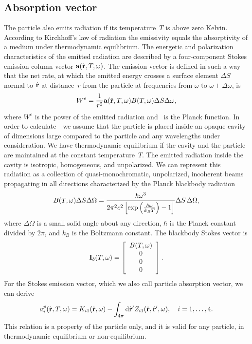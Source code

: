 \subsection{Absorption vector}
\label{sec:rtetheory:abs_vec}
The particle also emits radiation if its temperature~$T$ is above zero
Kelvin. According to Kirchhoff's law of radiation the emissivity
equals the absorptivity of a medium under thermodynamic equilibrium.
The energetic and polarization characteristics of the emitted
radiation are described by a four-component Stokes emission column
vector ${\bf a}(\hat{\mathbf{r}}, T, \omega)$. The emission vector is
defined in such a way that the net rate, at which the emitted energy
crosses a surface element $\Delta S$ normal to $\hat{\mathbf{r}}$ at
distance~$r$ from the particle at frequencies from $\omega$ to $\omega
+ \Delta\omega$, is
\begin{equation}
  W^e = \frac{1}{r^2}{\bf a}(\hat{\mathbf{r}}, T, \omega)
  B(T,\omega) \Delta S \Delta\omega,
\end{equation}
where $W^e$ is the power of the emitted radiation and \Planck\ is the
Planck function.  In order to calculate~\AbsVec\ we assume that the
particle is placed inside an opaque cavity of dimensions large
compared to the particle and any wavelengths under consideration. We
have thermodynamic equilibrium if the cavity and the particle are
maintained at the constant temperature~$T$. The emitted radiation
inside the cavity is isotropic, homogeneous, and unpolarized. We can
represent this radiation as a collection of quasi-monochromatic,
unpolarized, incoherent beams propagating in all directions
characterized by the Planck blackbody radiation
\begin{equation}
  \label{eq:rtetheory:Planck}
  B(T,\omega)\Delta S \Delta\Omega =
    \frac{\hbar\omega^3}{2\pi^2 c^2\left[\exp\left(\frac{\hbar\omega}{k_B T}\right) -1\right]}
     \Delta S \, \Delta\Omega,
\end{equation}
where $\Delta \Omega$ is a small solid angle about any direction,
$\hbar$ is the Planck constant divided by $2\pi$, and $k_B$ is the
Boltzmann constant. The blackbody Stokes vector is
\begin{equation}
  {\bf I}_b(T, \omega) = \left[ \begin{array}{c} B(T,\omega)\\ 0 \\ 0 \\ 0 \end{array} \right].
\end{equation}
For the Stokes emission vector, which we also call particle absorption
vector, we can derive
\begin{equation}
  \label{eq:rtetheory:abs_vec}
  a_i^p(\hat{\mathbf{r}}, T, \omega) =
  K_{i1}(\hat{\mathbf{r}},\omega) - \int_{4\pi} \mathrm{d}\hat{\mathbf{r}}' Z_{i1}(\hat{\mathbf{r}}, \hat{\mathbf{r}}', \omega) ,
 \quad i = 1,\ldots,4. 
\end{equation}
This relation is a property of the particle only, and it is valid for
any particle, in thermodynamic equilibrium or non-equilibrium.


